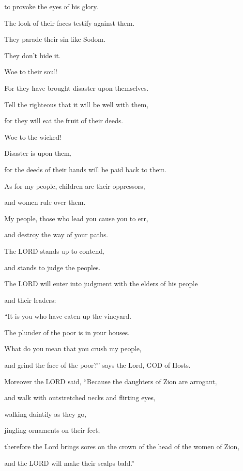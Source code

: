 to provoke the eyes of his glory.

\myverse{}The look of their faces testify against them.

They parade their sin like Sodom.

They don’t hide it.

Woe to their soul!

For they have brought disaster upon themselves.

\myverse{}Tell the righteous that it will be well with them,

for they will eat the fruit of their deeds.

\myverse{}Woe to the wicked!

Disaster is upon them,

for the deeds of their hands will be paid back to them.

\myverse{}As for my people, children are their oppressors,

and women rule over them.

My people, those who lead you cause you to err,

and destroy the way of your paths.


\vspace{\baselineskip} \myverse{}The LORD stands up to contend,

and stands to judge the peoples.

\myverse{}The LORD will enter into judgment with the elders of his people

and their leaders:

“It is you who have eaten up the vineyard.

The plunder of the poor is in your houses.

\myverse{}What do you mean that you crush my people,

and grind the face of the poor?” says the Lord, GOD of Hosts.


\vspace{\baselineskip} \myverse{}Moreover the LORD said, “Because the daughters of Zion are arrogant,

and walk with outstretched necks and flirting eyes,

walking daintily as they go,

jingling ornaments on their feet;

\myverse{}therefore the Lord brings sores on the crown of the head of
the women of Zion,

and the LORD will make their scalps bald.”

